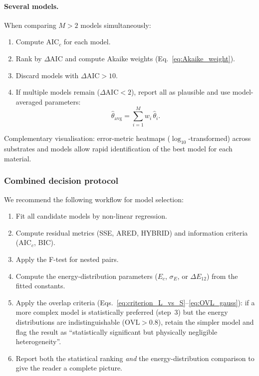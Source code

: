 \documentclass[12pt]{article}
\begin{document}
	\paragraph{Several models.}
	When comparing $M > 2$ models simultaneously:
	\begin{enumerate}
		\item Compute AIC$_c$ for each model.
		\item Rank by $\Delta\mathrm{AIC}$ and compute Akaike weights
		(Eq.~\eqref{eq:Akaike_weight}).
		\item Discard models with $\Delta\mathrm{AIC} > 10$.
		\item If multiple models remain ($\Delta\mathrm{AIC} < 2$),
		report all as plausible and use model-averaged parameters:
		\begin{equation}
			\hat{\theta}_{\mathrm{avg}}
			= \sum_{i=1}^{M} w_i\,\hat{\theta}_i.
			\label{eq:model_averaging}
		\end{equation}
	\end{enumerate}
	Complementary visualisation: error-metric heatmaps
	($\log_{10}$-transformed) across substrates and models allow
	rapid identification of the best model for each material.

	\subsubsection{Combined decision protocol}

	We recommend the following workflow for model selection:
	\begin{enumerate}
		\item Fit all candidate models by non-linear regression.
		\item Compute residual metrics (SSE, ARED, HYBRID) and
		information criteria (AIC$_c$, BIC).
		\item Apply the F-test for nested pairs.
		\item Compute the energy-distribution parameters ($E_c$,
		$\sigma_E$, or $\Delta E_{12}$) from the fitted constants.
		\item Apply the overlap criteria
		(Eqs.~\eqref{eq:criterion_L_vs_S}--\eqref{eq:OVL_gauss}):
		if a more complex model is statistically preferred (step~3)
		but the energy distributions are indistinguishable
		($\mathrm{OVL} > 0.8$), retain the simpler model and flag
		the result as ``statistically significant but physically
		negligible heterogeneity''.
		\item Report both the statistical ranking \emph{and} the
		energy-distribution comparison to give the reader a complete
		picture.
	\end{enumerate}
\end{document}
